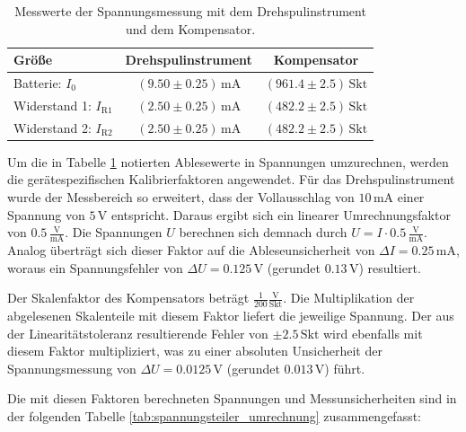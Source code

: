 \documentclass[12pt,a4paper,titlepage]{scrartcl}
\numberwithin{equation}{section}
\numberwithin{table}{section}
\numberwithin{figure}{section}
\begin{document}
\begin{table}[H]
    \centering
    \caption{Messwerte der Spannungsmessung mit dem Drehspulinstrument und dem Kompensator.}
    \label{tab:spannungsteiler_messwerte}
    \begin{tabular}{lcc}
        \toprule
        \textbf{Größe} & \textbf{Drehspulinstrument} & \textbf{Kompensator} \\
        \midrule
        Batterie: $I_0$ & $(9.50\pm 0.25)\,\si{\milli\ampere}$ & $(961.4\pm 2.5)\,\text{Skt}$ \\
        Widerstand 1: $I_\text{R1}$ & $(2.50\pm 0.25)\,\si{\milli\ampere}$ & $(482.2\pm 2.5)\,\text{Skt}$ \\
        Widerstand 2: $I_\text{R2}$ & $(2.50\pm 0.25)\,\si{\milli\ampere}$ & $(482.2\pm 2.5)\,\text{Skt}$ \\
        \bottomrule
    \end{tabular}
\end{table}

Um die in Tabelle \ref{tab:spannungsteiler_messwerte} notierten Ablesewerte in Spannungen umzurechnen,
werden die gerätespezifischen Kalibrierfaktoren angewendet. Für das Drehspulinstrument wurde der Messbereich so erweitert,
dass der Vollausschlag von $10\,\si{\milli\ampere}$ einer Spannung von $5\,\text{V}$ entspricht. Daraus ergibt sich ein linearer
Umrechnungsfaktor von $0.5\,\frac{\text{V}}{\si{\milli\ampere}}$. Die Spannungen $U$ berechnen sich demnach
durch $U = I \cdot 0.5\,\frac{\text{V}}{\si{\milli\ampere}}$. 
Analog überträgt sich dieser Faktor auf die Ableseunsicherheit von $\Delta I = 0.25\,\si{\milli\ampere}$, 
woraus ein Spannungsfehler von $\Delta U = 0.125\,\text{V}$ (gerundet $0.13\,\text{V}$) resultiert.

Der Skalenfaktor des Kompensators beträgt $\frac{1}{200}\frac{\text{V}}{\text{Skt}}$. Die Multiplikation der abgelesenen Skalenteile mit diesem Faktor liefert die
jeweilige Spannung. Der aus der Linearitätstoleranz resultierende Fehler von $\pm 2.5\,\text{Skt}$ wird ebenfalls mit diesem Faktor multipliziert,
was zu einer absoluten Unsicherheit der Spannungsmessung von $\Delta U = 0.0125\,\text{V}$ (gerundet $0.013\,\text{V}$) führt. 

Die mit diesen Faktoren berechneten Spannungen und Messunsicherheiten sind in der folgenden Tabelle \ref{tab:spannungsteiler_umrechnung} zusammengefasst:
\end{document}
